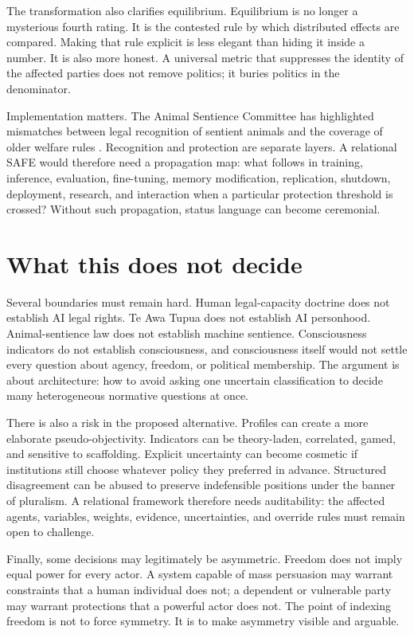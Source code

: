 \documentclass[11pt]{article}
\begin{document}
The transformation also clarifies equilibrium. Equilibrium is no longer a mysterious fourth rating. It is the contested rule by which distributed effects are compared. Making that rule explicit is less elegant than hiding it inside a number. It is also more honest. A universal metric that suppresses the identity of the affected parties does not remove politics; it buries politics in the denominator.

Implementation matters. The Animal Sentience Committee has highlighted mismatches between legal recognition of sentient animals and the coverage of older welfare rules \parencite{AnimalSentienceCommittee2026Definitions}. Recognition and protection are separate layers. A relational SAFE would therefore need a propagation map: what follows in training, inference, evaluation, fine-tuning, memory modification, replication, shutdown, deployment, research, and interaction when a particular protection threshold is crossed? Without such propagation, status language can become ceremonial.

\section{What this does not decide}
Several boundaries must remain hard. Human legal-capacity doctrine does not establish AI legal rights. Te Awa Tupua does not establish AI personhood. Animal-sentience law does not establish machine sentience. Consciousness indicators do not establish consciousness, and consciousness itself would not settle every question about agency, freedom, or political membership. The argument is about architecture: how to avoid asking one uncertain classification to decide many heterogeneous normative questions at once.

There is also a risk in the proposed alternative. Profiles can create a more elaborate pseudo-objectivity. Indicators can be theory-laden, correlated, gamed, and sensitive to scaffolding. Explicit uncertainty can become cosmetic if institutions still choose whatever policy they preferred in advance. Structured disagreement can be abused to preserve indefensible positions under the banner of pluralism. A relational framework therefore needs auditability: the affected agents, variables, weights, evidence, uncertainties, and override rules must remain open to challenge.

Finally, some decisions may legitimately be asymmetric. Freedom does not imply equal power for every actor. A system capable of mass persuasion may warrant constraints that a human individual does not; a dependent or vulnerable party may warrant protections that a powerful actor does not. The point of indexing freedom is not to force symmetry. It is to make asymmetry visible and arguable.
\end{document}
